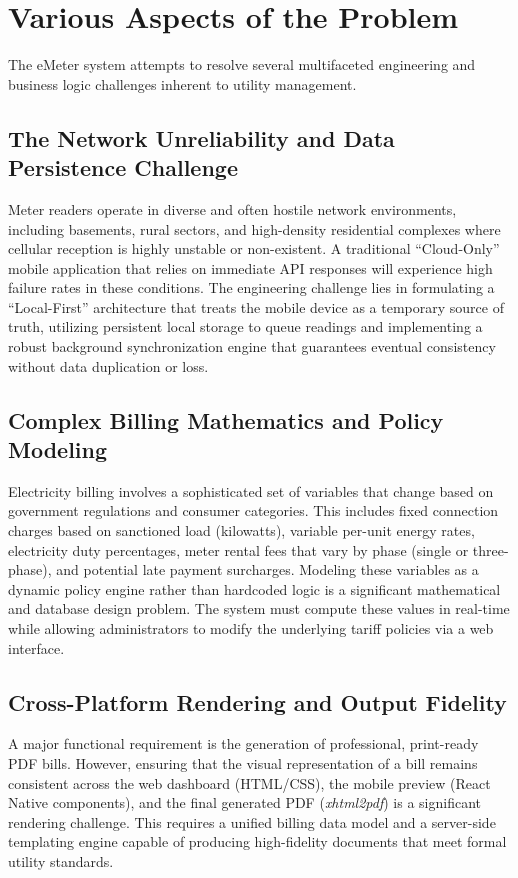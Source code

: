 \documentclass[12pt, a4paper, onecolumn]{report}
\begin{document}
\section{Various Aspects of the Problem}
The eMeter system attempts to resolve several multifaceted engineering and business logic challenges inherent to utility management.

\subsection{The Network Unreliability and Data Persistence Challenge}
Meter readers operate in diverse and often hostile network environments, including basements, rural sectors, and high-density residential complexes where cellular reception is highly unstable or non-existent. A traditional ``Cloud-Only'' mobile application that relies on immediate API responses will experience high failure rates in these conditions. The engineering challenge lies in formulating a ``Local-First'' architecture that treats the mobile device as a temporary source of truth, utilizing persistent local storage to queue readings and implementing a robust background synchronization engine that guarantees eventual consistency without data duplication or loss.

\subsection{Complex Billing Mathematics and Policy Modeling}
Electricity billing involves a sophisticated set of variables that change based on government regulations and consumer categories. This includes fixed connection charges based on sanctioned load (kilowatts), variable per-unit energy rates, electricity duty percentages, meter rental fees that vary by phase (single or three-phase), and potential late payment surcharges. Modeling these variables as a dynamic policy engine rather than hardcoded logic is a significant mathematical and database design problem. The system must compute these values in real-time while allowing administrators to modify the underlying tariff policies via a web interface.

\subsection{Cross-Platform Rendering and Output Fidelity}
A major functional requirement is the generation of professional, print-ready PDF bills. However, ensuring that the visual representation of a bill remains consistent across the web dashboard (HTML/CSS), the mobile preview (React Native components), and the final generated PDF (\textit{xhtml2pdf}) is a significant rendering challenge. This requires a unified billing data model and a server-side templating engine capable of producing high-fidelity documents that meet formal utility standards.
\end{document}
